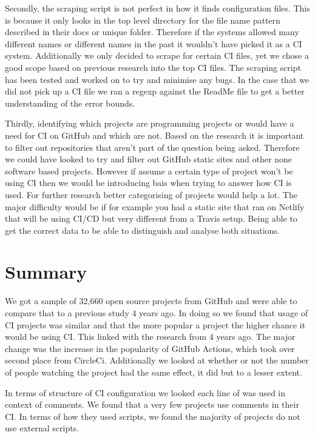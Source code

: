 \documentclass[10pt,conference]{IEEEtran}
\begin{document}
Secondly, the scraping script is not perfect in how it finds configuration files. This is because it only looks in the top level directory for the file name pattern described in their docs or unique folder. Therefore if the systems allowed many different names or different names in the past it wouldn't have picked it as a CI system. Additionally we only decided to scrape for certain CI files, yet we chose a good scope based on previous research into the top CI files. The scraping script has been tested and worked on to try and minimise any bugs. In the case that we did not pick up a CI file we ran a regexp against the ReadMe file to get a better understanding of the error bounds.

Thirdly, identifying which projects are programming projects or would have a need for CI on GitHub and which are not. Based on the research \cite{Kalliamvakou2014} it is important to filter out repositories that aren't part of the question being asked. Therefore we could have looked to try and filter out GitHub static sites and other none software based projects. However if assume a certain type of project won't be using CI then we would be introducing bais when trying to answer how CI is used. For further research better categorising of projects would help a lot. The major difficulty would be if for example you had a static site that ran on Netlify that will be using CI/CD but very different from a Travis setup. Being able to get the correct data to be able to distinguish and analyse both situations. 


\pagebreak



\section{Summary}

We got a sample of 32,660 open source projects from GitHub and were able to compare that to a previous study 4 years ago. In doing so we found that usage of CI projects was similar and that the more popular a project the higher chance it would be using CI. This linked with the research from 4 years ago. The major change was the increase in the popularity of GitHub Actions, which took over second place from CircleCi. Additionally we looked at whether or not the number of people watching the project had the same effect, it did but to a lesser extent.


In terms of structure of CI configuration we looked each line of was used in context of comments. We found that a very few projects use comments in their CI. In terms of how they used scripts, we found the majority of projects do not use external scripts. 
\end{document}
